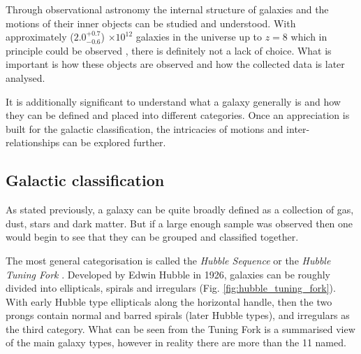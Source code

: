\documentclass[12pt, twocolumn]{revtex4}    %
\begin{document}
Through observational astronomy the internal structure of galaxies and the motions of their inner objects can be studied and understood. With approximately ($2.0^{+0.7}_{-0.6}$) $\times 10^{12}$ galaxies in the universe up to $z=8$ which in principle could be observed \citep{conselice_galaxynumber}, there is definitely not a lack of choice. What is important is how these objects are observed and how the collected data is later analysed. 


It is additionally significant to understand what a galaxy generally is and how they can be defined and placed into different categories. Once an appreciation is built for the galactic classification, the intricacies of motions and inter-relationships can be explored further. 


\subsection{Galactic classification}

As stated previously, a galaxy can be quite broadly defined as a collection of gas, dust, stars and dark matter. But if a large enough sample was observed then one would begin to see that they can be grouped and classified together.

The most general categorisation is called the \textit{Hubble Sequence} or the \textit{Hubble Tuning Fork} \citep{carroll_astro}. Developed by Edwin Hubble in 1926, galaxies can be roughly divided into ellipticals, spirals and irregulars (Fig. \ref{fig:hubble_tuning_fork}). With early Hubble type ellipticals along the horizontal handle, then the two prongs contain normal and barred spirals (later Hubble types), and irregulars as the third category. What can be seen from the Tuning Fork is a summarised view of the main galaxy types, however in reality there are more than the 11 named.
\end{document}
